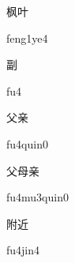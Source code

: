 \begin{verbete}[feng1ye4]{枫叶}
\begin{pronuncia}{feng1ye4}
\end{pronuncia}
\end{verbete}

\begin{verbete}[fu4]{副}
\begin{pronuncia}{fu4}
\end{pronuncia}
\end{verbete}

\begin{verbete}[fu4qin0]{父亲}
\begin{pronuncia}{fu4quin0}
\end{pronuncia}
\end{verbete}

\begin{verbete}[fu4mu3qin0]{父母亲}
\begin{pronuncia}{fu4mu3quin0}
\end{pronuncia}
\end{verbete}

\begin{verbete}[fu4jin4]{附近}
\begin{pronuncia}{fu4jin4}
\end{pronuncia}
\end{verbete}

